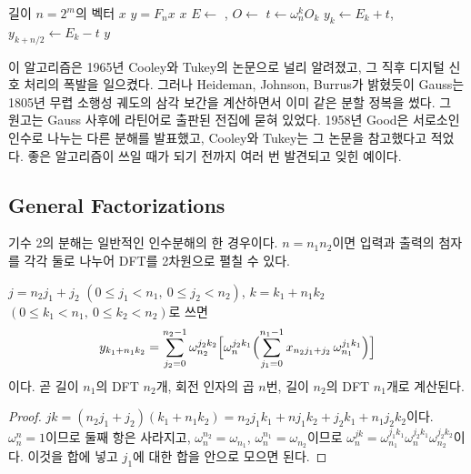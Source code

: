 \begin{algorithm}[t]
\begin{algorithmic}[1]
\Require 길이 $n=2^m$의 벡터 $x$
\Ensure $y=F_nx$
   \Return $x$
  \EndIf
  \State $E\gets$ , $O\gets$ 
    \State $t\gets\omega_n^kO_k$ 
    \State $y_k\gets E_k+t$, $y_{k+n/2}\gets E_k-t$ 
  \EndFor
  \State \Return $y$
\EndFunction
\end{algorithmic}
\caption{기수 2의 재귀 FFT}
\label{alg:fft-radix2}
\end{algorithm}

\begin{aside}
이 알고리즘은 1965년 Cooley와 Tukey의 논문으로 널리 알려졌고\cite{cooley1965}, 그 직후 디지털 신호 처리의 폭발을 일으켰다. 그러나 Heideman, Johnson, Burrus가 밝혔듯이 Gauss는 1805년 무렵 소행성 궤도의 삼각 보간을 계산하면서 이미 같은 분할 정복을 썼다\cite{heideman1984gauss}. 그 원고는 Gauss 사후에 라틴어로 출판된 전집에 묻혀 있었다. 1958년 Good은 서로소인 인수로 나누는 다른 분해를 발표했고\cite{good1958}, Cooley와 Tukey는 그 논문을 참고했다고 적었다. 좋은 알고리즘이 쓰일 때가 되기 전까지 여러 번 발견되고 잊힌 예이다.
\end{aside}

\subsection{General Factorizations}

기수 2의 분해는 일반적인 인수분해의 한 경우이다. $n=n_1n_2$이면 입력과 출력의 첨자를 각각 둘로 나누어 DFT를 2차원으로 펼칠 수 있다.

\begin{proposition}
\label{prop:mixed-radix}
$j=n_2j_1+j_2$ $(0\le j_1<n_1,\ 0\le j_2<n_2)$, $k=k_1+n_1k_2$ $(0\le k_1<n_1,\ 0\le k_2<n_2)$로 쓰면
\[
y_{k_1+n_1k_2}=\sum_{j_2=0}^{n_2-1}\omega_{n_2}^{j_2k_2}\Bigl[\omega_n^{j_2k_1}\Bigl(\sum_{j_1=0}^{n_1-1}x_{n_2j_1+j_2}\,\omega_{n_1}^{j_1k_1}\Bigr)\Bigr]
\]
이다. 곧 길이 $n_1$의 DFT $n_2$개, 회전 인자의 곱 $n$번, 길이 $n_2$의 DFT $n_1$개로 계산된다.
\end{proposition}

\begin{proof}
$jk=(n_2j_1+j_2)(k_1+n_1k_2)=n_2j_1k_1+nj_1k_2+j_2k_1+n_1j_2k_2$이다. $\omega_n^{n}=1$이므로 둘째 항은 사라지고, $\omega_n^{n_2}=\omega_{n_1}$, $\omega_n^{n_1}=\omega_{n_2}$이므로 $\omega_n^{jk}=\omega_{n_1}^{j_1k_1}\omega_n^{j_2k_1}\omega_{n_2}^{j_2k_2}$이다. 이것을 합에 넣고 $j_1$에 대한 합을 안으로 모으면 된다.
\end{proof}


